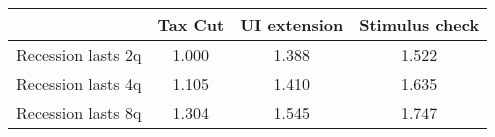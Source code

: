 \begin{tabular}{@{}lccc@{}} 
\toprule 
& Tax Cut    & UI extension    & Stimulus check    \\  \midrule 
Recession lasts 2q &1.000  & 1.388  & 1.522     \\ 
Recession lasts 4q &1.105  & 1.410  & 1.635     \\ 
Recession lasts 8q &1.304  & 1.545  & 1.747     \\ 
\end{tabular}  
